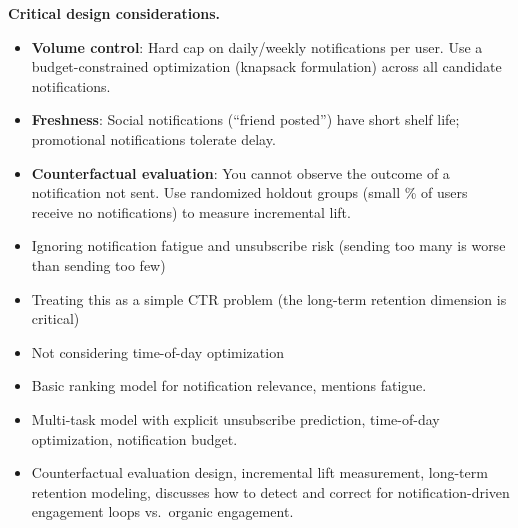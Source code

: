 \begin{interviewq}
\textbf{Critical design considerations.}
\begin{itemize}
    \item \textbf{Volume control}: Hard cap on daily/weekly notifications per user. Use a budget-constrained optimization (knapsack formulation) across all candidate notifications.
    \item \textbf{Freshness}: Social notifications (``friend posted'') have short shelf life; promotional notifications tolerate delay.
    \item \textbf{Counterfactual evaluation}: You cannot observe the outcome of a notification not sent. Use randomized holdout groups (small \% of users receive no notifications) to measure incremental lift.
\end{itemize}

\redflags
\begin{itemize}
    \item Ignoring notification fatigue and unsubscribe risk (sending too many is worse than sending too few)
    \item Treating this as a simple CTR problem (the long-term retention dimension is critical)
    \item Not considering time-of-day optimization
\end{itemize}


\goodgreat
\begin{itemize}
    \item {} Basic ranking model for notification relevance, mentions fatigue.
    \item {} Multi-task model with explicit unsubscribe prediction, time-of-day optimization, notification budget.
    \item {} Counterfactual evaluation design, incremental lift measurement, long-term retention modeling, discusses how to detect and correct for notification-driven engagement loops vs.\ organic engagement.
\end{itemize}

\end{interviewq}

